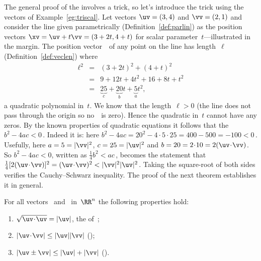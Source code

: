 \begin{example} \label{eg:}
The general proof of the  involves a trick, so let's introduce the trick using the vectors of Example~\ref{eg:triscal}.
Let vectors \(\uv=(3,4)\) and \(\vv=(2,1)\) and consider the line given parametrically (Definition~\ref{def:parlin}) as the position vectors \(\xv=\uv+t\vv=(3+2t,4+t)\) for scalar parameter~\(t\)---illustrated in the margin.
%
The position vector~\xv\ of any point on the line has length~\(\ell\) (Definition~\ref{def:veclen}) where
\begin{eqnarray*}
\ell^2&=&(3+2t)^2+(4+t)^2
\\&=&9+12t+4t^2+16+8t+t^2
\\&=&\underbrace{25}_{c}+\underbrace{20}_{b}t+\underbrace{5}_{a}t^2,
\end{eqnarray*}
a quadratic polynomial in~\(t\).
We know that the length~\(\ell>0\)  (the line does not pass through the origin so no~\xv\ is zero).
Hence the quadratic in~\(t\) cannot have any zeros.
By the known properties of quadratic equations it follows that the  \(b^2-4ac<0\)\,.
Indeed it is: here \(b^2-4ac=20^2-4\cdot5\cdot25=400-500=-100<0\)\,.
Usefully, here \(a=5=|\vv|^2\), \(c=25=|\uv|^2\) and \(b=20=2\cdot10=2(\uv\cdot\vv)\).
So \(b^2-4ac<0\), written as \(\tfrac14b^2<ac\)\,, becomes the statement that \(\tfrac14[2(\uv\cdot\vv)]^2=(\uv\cdot\vv)^2<|\vv|^2|\uv|^2\).
Taking the square-root of both sides verifies the Cauchy--Schwarz inequality.  
The proof of the next theorem establishes it in general.
\end{example}






\begin{theorem} \label{thm:triscal}
For all vectors \uv\ and \vv\ in~\(\RR^n\) the following properties hold:
\begin{enumerate}
  \item\label{thm:triscala} \(\sqrt{\uv\cdot\uv}=|\uv|\), the  of~\uv;
\item\label{thm:triscalb} \(|\uv\cdot\vv|\leq|\uv||\vv|\) ();
\item\label{thm:triscalc} \(|\uv\pm\vv|\leq|\uv|+|\vv|\) ().
\end{enumerate}
\end{theorem}


